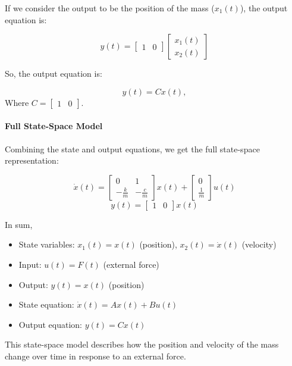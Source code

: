 If we consider the output to be the position of the mass (\( x_1(t) \)), the output equation is:

\[ y(t) = \begin{bmatrix} 1 & 0 \end{bmatrix} \begin{bmatrix} x_1(t) \\ x_2(t) \end{bmatrix} \]

So, the output equation is:

\[ y(t) = Cx(t), \]
Where \( C = \begin{bmatrix} 1 & 0 \end{bmatrix} \).

\paragraph{Full State-Space Model}

Combining the state and output equations, we get the full state-space representation:

\[ \dot{x}(t) = \begin{bmatrix} 0 & 1 \\ -\frac{k}{m} & -\frac{c}{m} \end{bmatrix} x(t) + \begin{bmatrix} 0 \\ \frac{1}{m} \end{bmatrix} u(t) \]
\[ y(t) = \begin{bmatrix} 1 & 0 \end{bmatrix} x(t) \]

In sum,
\begin{itemize}
	\item State variables: \( x_1(t) = x(t) \) (position), \( x_2(t) = \dot{x}(t) \) (velocity)
	\item Input: \( u(t) = F(t) \) (external force)
	\item Output: \( y(t) = x(t) \) (position)
	\item State equation: \( \dot{x}(t) = Ax(t) + Bu(t) \)
	\item Output equation: \( y(t) = Cx(t) \)
\end{itemize}

This state-space model describes how the position and velocity of the mass change over time in response to an external force.



